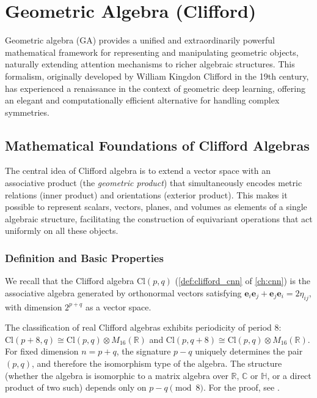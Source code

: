 \section{Geometric Algebra (Clifford)}\label{sec:clifford_attention}

Geometric algebra (GA) provides a unified and extraordinarily powerful mathematical framework for representing and manipulating geometric objects, naturally extending attention mechanisms to richer algebraic structures. This formalism, originally developed by William Kingdon Clifford in the 19th century, has experienced a renaissance in the context of geometric deep learning, offering an elegant and computationally efficient alternative for handling complex symmetries.

\subsection{Mathematical Foundations of Clifford Algebras}

The central idea of Clifford algebra is to extend a vector space with an associative product (the \textit{geometric product}) that simultaneously encodes metric relations (inner product) and orientations (exterior product). This makes it possible to represent scalars, vectors, planes, and volumes as elements of a single algebraic structure, facilitating the construction of equivariant operations that act uniformly on all these objects.

\subsubsection{Definition and Basic Properties}

We recall that the Clifford algebra $\text{Cl}(p,q)$ (\autoref{def:clifford_cnn} of \autoref{ch:cnn}) is the associative algebra generated by orthonormal vectors satisfying $\mathbf{e}_i \mathbf{e}_j + \mathbf{e}_j \mathbf{e}_i = 2\eta_{ij}$, with dimension $2^{p+q}$ as a vector space.\label{def:algebra_clifford}

\begin{theorem}\label{thm:clasificacion_clifford}
The classification of real Clifford algebras exhibits periodicity of period 8: $\text{Cl}(p+8, q) \cong \text{Cl}(p, q) \otimes M_{16}(\mathbb{R})$ and $\text{Cl}(p, q+8) \cong \text{Cl}(p, q) \otimes M_{16}(\mathbb{R})$. For fixed dimension $n = p + q$, the signature $p - q$ uniquely determines the pair $(p,q)$, and therefore the isomorphism type of the algebra. The structure (whether the algebra is isomorphic to a matrix algebra over $\mathbb{R}$, $\mathbb{C}$ or $\mathbb{H}$, or a direct product of two such) depends only on $p - q \pmod{8}$. For the proof, see \citep{lawson1989spin}.
\end{theorem}

